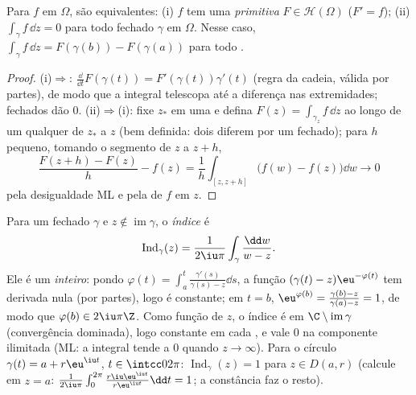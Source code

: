 \begin{proposition}[Primitivas]\label{prop:b3:holomorphic:primitive}
Para $f$  em $\Omega$, são equivalentes: (i) $f$ tem
uma \emph{primitiva} $F \in \mathcal H(\Omega)$ ($F'
= f$); (ii) $\int_\gamma f\,\dd z = 0$ para todo 
fechado $\gamma$ em $\Omega$. Nesse caso, $\int_\gamma f\,\dd z =
F(\gamma(b)) - F(\gamma(a))$ para todo .
\end{proposition}

\begin{proof}
(i)$\Rightarrow$: $\frac{\dd}{\dd t}F(\gamma(t)) =
F'(\gamma(t))\gamma'(t)$ (regra da cadeia, válida por partes), de modo que a
integral telescopa até a diferença nas extremidades;  fechados
dão $0$. (ii)$\Rightarrow$(i): fixe $z_*$ em uma  e defina
$F(z) = \int_{\gamma_z}f\,\dd z$ ao longo de um  qualquer de $z_*$ a $z$ (bem definida:
dois  diferem por um  fechado); para $h$ pequeno,
tomando o segmento de $z$ a $z + h$,
\[
\frac{F(z + h) - F(z)}{h} - f(z)
= \frac1h\int_{[z, z+h]}\bigl(f(w) - f(z)\bigr)\dd w
\longrightarrow 0
\]
pela desigualdade ML e pela  de $f$ em $z$.
\end{proof}

\begin{definition}\label{def:b3:holomorphic:index}
Para um  fechado $\gamma$ e $z \notin
\operatorname{im}\gamma$, o \emph{índice} é
\[
\operatorname{Ind}_\gamma(z) = \frac1{2\iu\pi}
\int_\gamma\frac{\dd w}{w - z} .
\]
Ele é um \emph{inteiro}: pondo $\varphi(t) =
\int_a^t\frac{\gamma'(s)}{\gamma(s) - z}\dd s$, a função $(\gamma(t) - z)\eu^{-\varphi(t)}$ tem derivada nula
(por partes), logo é constante; em $t = b$, $\eu^{\varphi(b)} =
\frac{\gamma(b) - z}{\gamma(a) - z} = 1$, de modo que $\varphi(b) \in
2\iu\pi\Z$.
Como função de $z$, o índice é  em $\C\setminus\operatorname{im}\gamma$ (convergência
dominada), logo constante em cada , e vale $0$ na
componente ilimitada (ML: a integral tende a $0$ quando $z \to
\infty$). Para o
círculo $\gamma(t) = a + r\eu^{\iu t}$, $t
\in \intcc0{2\pi}$: $\operatorname{Ind}_\gamma(z) = 1$ para $z
\in D(a,r)$ (calcule em $z = a$: $\frac1{2\iu\pi}
\int_0^{2\pi}\frac{r\iu\eu^{\iu t}}{r\eu^{\iu t}}\dd t = 1$; a
constância faz o resto).
\end{definition}


